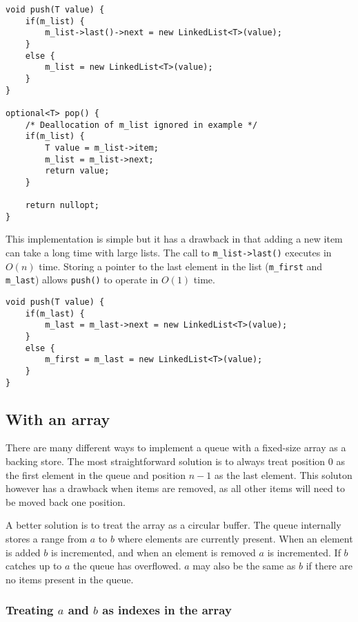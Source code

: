 \documentclass[a4paper,11pt]{article}
\begin{document}
\begin{verbatim}
void push(T value) {
	if(m_list) {
		m_list->last()->next = new LinkedList<T>(value);
	}
	else {
		m_list = new LinkedList<T>(value);
	}
}

optional<T> pop() {
	/* Deallocation of m_list ignored in example */
	if(m_list) {
		T value = m_list->item;
		m_list = m_list->next;
		return value;
	}

	return nullopt;
}
\end{verbatim}

This implementation is simple but it has a drawback in that adding a new item can take a long time with large lists. The call to \texttt{m_list->last()} executes in $O(n)$ time.
Storing a pointer to the last element in the list (\texttt{m_first} and \texttt{m_last}) allows \texttt{push()} to operate in $O(1)$ time.

\begin{verbatim}
void push(T value) {
	if(m_last) {
		m_last = m_last->next = new LinkedList<T>(value);
	}
	else {
		m_first = m_last = new LinkedList<T>(value);
	}
}
\end{verbatim}

\subsection*{With an array}

There are many different ways to implement a queue with a fixed-size array as a backing store.
The most straightforward solution is to always treat position $0$ as the first element in the queue and position $n-1$ as the last element.
This soluton however has a drawback when items are removed, as all other items will need to be moved back one position.

A better solution is to treat the array as a circular buffer. The queue internally stores a range from $a$ to $b$ where elements are currently present.
When an element is added $b$ is incremented, and when an element is removed $a$ is incremented. If $b$ catches up to $a$ the queue has overflowed.
$a$ may also be the same as $b$ if there are no items present in the queue.

\subsubsection*{Treating $a$ and $b$ as indexes in the array}
\end{document}
